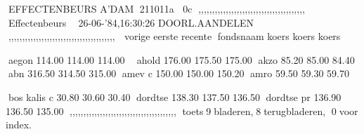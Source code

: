 \c
EFFECTENBEURS A'DAM    211011a    0c
,,,,,,,,,,,,,,,,,,,,,,,,,,,,,,,,,,,,,,,
\DAmsterdamse Effectenbeurs  \dbinnenland
                                       
26-06-'84,16:30:26       DOORL.AANDELEN
,,,,,,,,,,,,,,,,,,,,,,,,,,,,,,,,,,,,,,,
             vorige   eerste   recente 
fondsnaam    koers    koers    koers   
                                        
aegon        114.00   114.00   114.00  
                                       
ahold        176.00   175.50   175.00  
akzo         85.20    85.00    84.40   
abn          316.50   314.50   315.00  
amev c       150.00   150.00   150.20  
amro         59.50    59.30    59.70   
                                        
bos kalis c  30.80    30.60    30.40   
dordtse      138.30   137.50   136.50  
dordtse pr   136.90   136.50   135.00  
,,,,,,,,,,,,,,,,,,,,,,,,,,,,,,,,,,,,,,,
toets9bladeren,8terugbladeren,     
      0voor index.                    